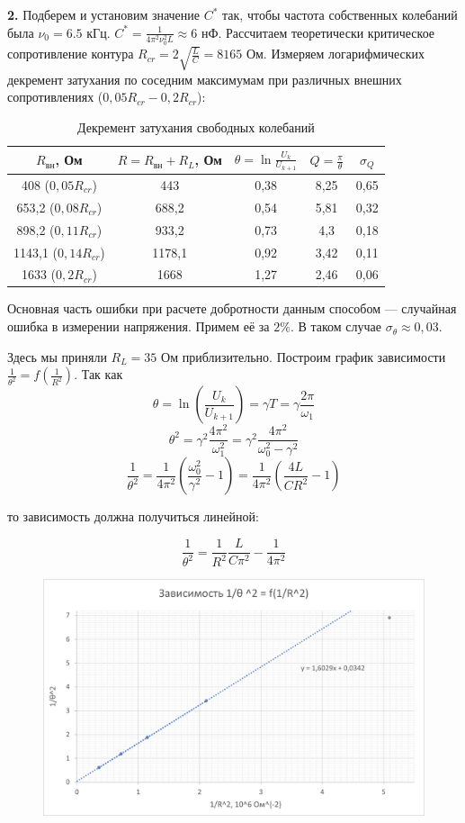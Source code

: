 \documentclass[a4paper, 12pt]{article}
\begin{document}
	\textbf{2.} Подберем и установим значение $C^*$ так, чтобы частота собственных колебаний была $\nu_0 = 6.5$ кГц. $C^* = \frac{1}{4\pi^2\nu_0^2L} \approx 6$ нФ. Рассчитаем теоретически критическое сопротивление контура $R_{cr} = 2\sqrt{\frac{L}{C}} = 8165$ Ом. Измеряем логарифмических декремент затухания по соседним максимумам при различных внешних сопротивлениях ($0,05 R_{cr} - 0,2R_{cr}$):
	\newpage
	\begin{table}[h]
		\centering
		\begin{tabular}{|c|c|c|c|c|}
			\hline
			$R_{\text{вн}}$, Ом & $R = R_{\text{вн}} + R_L$, Ом& $\theta = \ln \frac{U_k}{U_{k+1}}$ & $Q = \frac{\pi}{\theta}$ & $\sigma_{Q}$ \\ \hline
			 408 ($0,05R_{cr}$) & 443 & 0,38 & 8,25 & 0,65 \\ \hline
			653,2 ($0,08R_{cr}$) & 688,2 & 0,54 & 5,81 & 0,32  \\ \hline
			898,2 ($0,11R_{cr}$) & 933,2 & 0,73 & 4,3 & 0,18 \\ \hline
			1143,1 ($0,14R_{cr}$) & 1178,1 & 0,92 & 3,42 & 0,11 \\ \hline
			1633 ($0,2R_{cr}$) & 1668 & 1,27 & 2,46 & 0,06 \\ \hline
		\end{tabular}
		\caption{Декремент затухания свободных колебаний}
	\end{table}
	
	Основная часть ошибки при расчете добротности данным способом --- случайная ошибка в измерении напряжения. Примем её за $2\%$. В таком случае $\sigma_{\theta} \approx 0,03$.
	
	Здесь мы приняли $R_L = 35$ Ом приблизительно.
	Построим график зависимости $\frac{1}{\theta^2} = f(\frac{1}{R^2})$. Так как
	\[\theta = \ln\left(\frac{U_k}{U_{k + 1}}\right) = \gamma T = \gamma \frac{2\pi}{\omega_1}\]
	\[\theta^2 = \gamma^2\frac{4\pi^2}{\omega_1^2} = \gamma^2 \frac{4\pi^2}{\omega_0^2 - \gamma^2}\]
	\[\frac{1}{\theta^2} = \frac{1}{4\pi^2}\left(\frac{\omega_0^2}{\gamma^2} - 1\right) = \frac{1}{4\pi^2}\left(\frac{4L}{CR^2} - 1\right)\]
	
	то зависимость должна получиться линейной:
	
	\[\frac{1}{\theta^2} = \frac{1}{R^2}\frac{L}{C\pi^2} - \frac{1}{4\pi^2}\]
	\begin{figure}[h]
		\centering
		\includegraphics[width = \textwidth]{Gr2}
	\end{figure}
	
\end{document}
